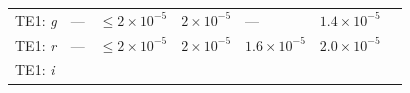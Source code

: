 \documentclass[DM,lsstdraft,toc]{lsstdoc}
\begin{document}
\begin{longtable}[]{@{}lllllll@{}}
\begin{minipage}[t]{0.12\columnwidth}
TE1: \emph{g}\strut
\end{minipage} & \begin{minipage}[t]{0.06\columnwidth}\raggedright\strut
---\strut
\end{minipage} & \begin{minipage}[t]{0.14\columnwidth}\raggedright\strut
\(\leq 2\times10^{-5}\)\strut
\end{minipage} & \begin{minipage}[t]{0.14\columnwidth}\raggedright\strut
\(2\times10^{-5}\)\strut
\end{minipage} & \begin{minipage}[t]{0.12\columnwidth}\raggedright\strut
---\strut
\end{minipage} & \begin{minipage}[t]{0.12\columnwidth}\raggedright\strut
\(1.4\times10^{-5}\) \strut
\end{minipage} & \begin{minipage}[t]{0.17\columnwidth}\raggedright\strut
\strut
\end{minipage}\tabularnewline
\begin{minipage}[t]{0.12\columnwidth}\raggedright\strut
TE1: \emph{r}\strut
\end{minipage} & \begin{minipage}[t]{0.06\columnwidth}\raggedright\strut
---\strut
\end{minipage} & \begin{minipage}[t]{0.14\columnwidth}\raggedright\strut
\(\leq 2\times10^{-5}\)\strut
\end{minipage} & \begin{minipage}[t]{0.14\columnwidth}\raggedright\strut
\(2\times10^{-5}\)\strut
\end{minipage} & \begin{minipage}[t]{0.12\columnwidth}\raggedright\strut
\(1.6\times10^{-5}\)\strut
\end{minipage} & \begin{minipage}[t]{0.12\columnwidth}\raggedright\strut
\(2.0\times10^{-5}\)\strut
\end{minipage} & \begin{minipage}[t]{0.17\columnwidth}\raggedright\strut
\strut
\end{minipage}\tabularnewline
\begin{minipage}[t]{0.12\columnwidth}\raggedright\strut
TE1: \emph{i}\strut
\end{minipage} & \begin{minipage}[t]{0.06\columnwidth}\raggedright\strut

\end{minipage}
\end{longtable}
\end{document}
